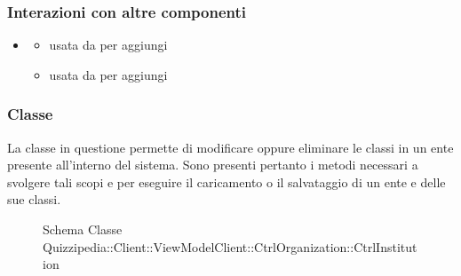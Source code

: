 \subsubsection{Interazioni con altre componenti}
\begin{itemize}
\item {}
\begin{itemize}
\item usata da  per aggiungi
\item usata da  per aggiungi
\end{itemize}
\end{itemize}
\subsubsection{Classe }
La classe in questione permette di modificare oppure eliminare le classi in un ente presente all'interno del sistema.
Sono presenti pertanto i metodi necessari a svolgere tali scopi e per eseguire il caricamento o il salvataggio di un ente e delle sue classi.
\begin{figure}[H]
\centering
\noindent{}
\caption[Schema Classe CtrlInstitution]{Schema Classe Quizzipedia::Client::ViewModelClient::CtrlOrganization::CtrlInstitution}
\end{figure}
